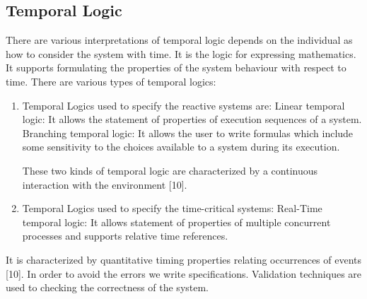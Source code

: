 \documentclass{article}
\begin{document}
\subsection{Temporal Logic}
\label{sec:templog}

There are various interpretations of temporal logic depends on the individual as how to consider the system with time. It is the logic for expressing mathematics. It supports formulating the properties of the system behaviour with respect to time. \newline There are various types of temporal logics: \newline



\begin{enumerate}
\item Temporal Logics used to specify the reactive systems are: \newline
 Linear temporal logic:  It allows the statement of properties of execution sequences of a system. \newline
 Branching temporal logic: It allows the user to write formulas which include some sensitivity to the choices available to a system during its execution.\newline

These two kinds of temporal logic are characterized by a continuous interaction with the environment [10].\newline
\item	Temporal Logics used to specify the time-critical systems: \newline
Real-Time temporal logic: It allows statement of properties of multiple concurrent processes and supports relative time references.\newline
\end{enumerate}

It is characterized by quantitative timing properties relating occurrences of events [10].
In order to avoid the errors we write specifications. Validation techniques are used to checking the correctness of the system.
\end{document}
